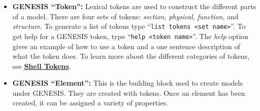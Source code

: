 \documentclass[12pt]{article}
\begin{document}
\begin{itemize}
\item {\bf GENESIS ``Token'':}  Lexical tokens are used to construct the different parts of a model. There are four sets of tokens:  {\it section}, {\it physical}, {\it function}, and {\it structure}. To generate a list of tokens type ``{\tt list tokens <set name>}''. To get help for a GENESIS token, type ``{\tt help <token name>}''. The {\it help} option gives an example of how to use a token and a one sentence description of what the token does. To learn more about the different categories of tokens, see \href{../shell-tokens/shell-tokens.tex}{\bf Shell Tokens}.

\item{\bf GENESIS ``Element'':} This is the building block used to create models under GENESIS. They are created with tokens. Once an element has been created, it can be assigned a variety of properties.

\end{itemize}
\end{document}
